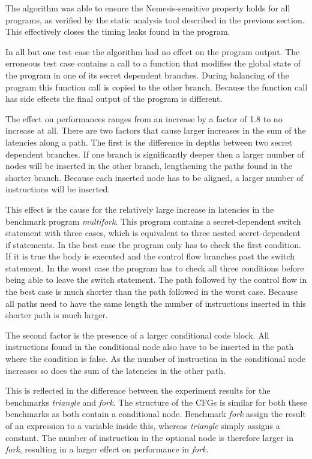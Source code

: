 The algorithm was able to ensure the Nemesis-sensitive property holds for all programs, as verified by the static analysis tool described in the previous section. This effectively closes the 
timing leaks found in the program. 

In all but one test case the algorithm had no effect on the program output. 
The erroneous test case contains a call to a function that modifies the global state of the program in one of its secret dependent branches. 
During balancing of the program this function call is copied to the other branch. 
Because the function call has side effects the final output of the program is different. 

The effect on performances ranges from an increase by a factor of 1.8 to no increase at all. 
There are two factors that cause larger increases in the sum of the latencies along a path. The first is the difference in depths between two secret dependent branches. 
If one branch is significantly deeper then a larger number of nodes will be inserted in the other branch, lengthening the paths found in the shorter branch. 
Because each inserted node has to be aligned, a larger number of instructions will be inserted. 

This effect is the cause for the relatively large increase in latencies in the benchmark  program \textit{multifork}. 
This program contains a secret-dependent switch statement with three cases, which is equivalent to three nested secret-dependent if statements. 
In the best case the program only has to check the first condition. If it is true the body is executed and the control flow branches past the switch statement. 
In the worst case the program has to check all three conditions before being able to leave the switch statement. 
The path followed by the control flow in the best case is much shorter than the path followed in the worst case. 
Because all paths need to have the same length the number of instructions inserted in this shorter path is much larger. 

The second factor is the presence of a larger conditional code block. All instructions found in the conditional node also have to be inserted in the path where the condition is false. 
As the number of instruction in the conditional node increases so does the sum of the latencies in the other path.

This is reflected in the difference between the experiment results for the benchmarks \textit{triangle} and \textit{fork}. The structure of the CFGs is similar for both these benchmarks as both contain a conditional node.
Benchmark \textit{fork} assign the result of an expression to a variable inside this, whereas \textit{triangle} simply assigns a constant. The number of instruction in the optional node is therefore larger in \textit{fork}, resulting 
in a larger effect on performance in \textit{fork}.


